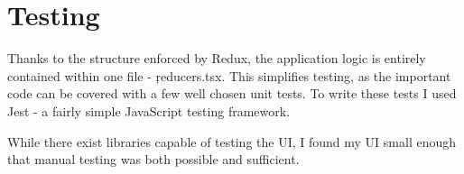 \section{Testing}
Thanks to the structure enforced by Redux, the application logic is entirely contained within one file - \c{reducers.tsx}. This simplifies testing, as the important code can be covered with a few well chosen unit tests. To write these tests I used Jest\cite{Jest} - a fairly simple JavaScript testing framework.

While there exist libraries capable of testing the UI, I found my UI small enough that manual testing was both possible and sufficient. 